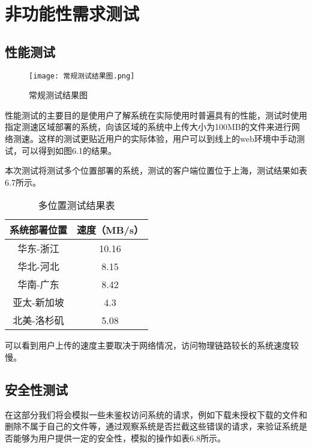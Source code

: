 \section{非功能性需求测试}%

\subsection{性能测试}%

\begin{figure}
  \centering
  \texttt{[image: 常规测试结果图.png]}
  \caption{常规测试结果图}
\end{figure}

性能测试的主要目的是使用户了解系统在实际使用时普遍具有的性能，测试时使用指定测速区域部署的系统，向该区域的系统中上传大小为100MB的文件来进行网络测速。这样的测试更贴近用户的实际体验，用户可以到线上的web环境中手动测试，可以得到如图6.1的结果。

本次测试将测试多个位置部署的系统，测试的客户端位置位于上海，测试结果如表6.7所示。

\begin{table}[h]
    \centering
    \caption{多位置测试结果表}
    \begin{tabular}{cc}
      \toprule
      系统部署位置   & 速度（MB/s）   \\
      \midrule
      华东-浙江     & 10.16  \\
      华北-河北     & 8.15   \\
      华南-广东     & 8.42  \\
      亚太-新加坡   & 4.3   \\
      北美-洛杉矶   & 5.08  \\
      \bottomrule
    \end{tabular}
\end{table}

可以看到用户上传的速度主要取决于网络情况，访问物理链路较长的系统速度较慢。

\subsection{安全性测试}%

在这部分我们将会模拟一些未鉴权访问系统的请求，例如下载未授权下载的文件和删除不属于自己的文件等，通过观察系统是否拦截这些错误的请求，来验证系统是否能够为用户提供一定的安全性，模拟的操作如表6.8所示。

